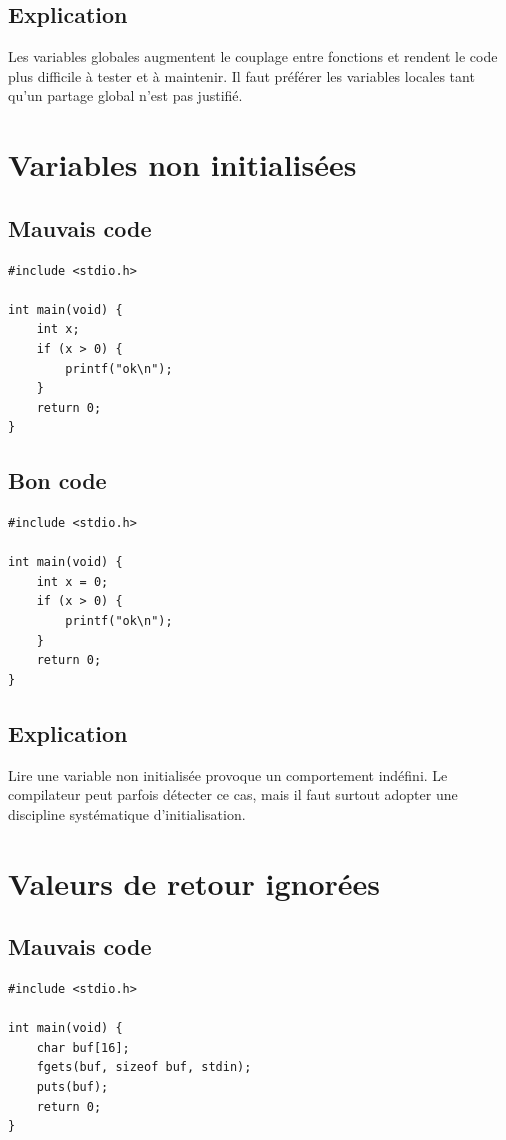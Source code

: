 \documentclass[a4paper,11pt]{report}
\begin{document}
\section{Explication}
Les variables globales augmentent le couplage entre fonctions et rendent le code plus difficile à tester et à maintenir.
Il faut préférer les variables locales tant qu'un partage global n'est pas justifié.

\chapter{Variables non initialisées}

\section{Mauvais code}
\begin{lstlisting}
#include <stdio.h>

int main(void) {
    int x;
    if (x > 0) {
        printf("ok\n");
    }
    return 0;
}
\end{lstlisting}

\section{Bon code}
\begin{lstlisting}
#include <stdio.h>

int main(void) {
    int x = 0;
    if (x > 0) {
        printf("ok\n");
    }
    return 0;
}
\end{lstlisting}

\section{Explication}
Lire une variable non initialisée provoque un comportement indéfini.
Le compilateur peut parfois détecter ce cas, mais il faut surtout adopter une discipline systématique d'initialisation.

\chapter{Valeurs de retour ignorées}

\section{Mauvais code}
\begin{lstlisting}
#include <stdio.h>

int main(void) {
    char buf[16];
    fgets(buf, sizeof buf, stdin);
    puts(buf);
    return 0;
}
\end{lstlisting}
\end{document}
